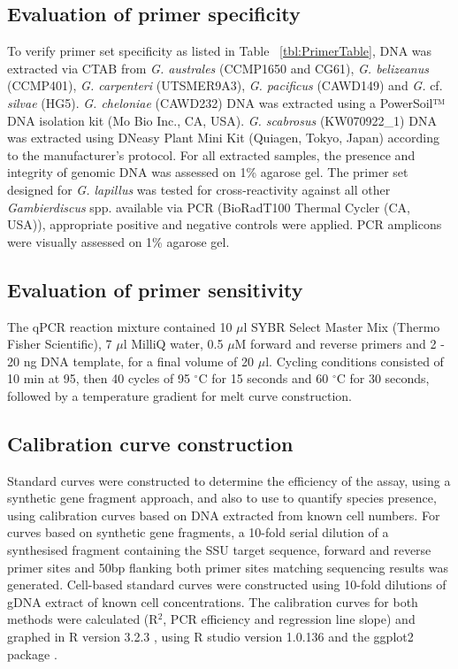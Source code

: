 \documentclass[12pt]{article}
\begin{document}
\subsection*{Evaluation of primer specificity}
To verify primer set specificity as listed in Table ~\ref{tbl:PrimerTable}, DNA was extracted via CTAB from \emph{G. australes} (CCMP1650 and CG61), \emph{G. belizeanus} (CCMP401), \emph{G. carpenteri} (UTSMER9A3), \emph{G. pacificus} (CAWD149) and \emph{G.} cf. \emph{silvae} (HG5). 
\emph{G. cheloniae} (CAWD232) DNA was extracted using a PowerSoil™ DNA isolation kit (Mo Bio Inc., CA, USA). 
\emph{G. scabrosus} (KW070922\_1) DNA was extracted using DNeasy Plant Mini Kit (Quiagen, Tokyo, Japan) according to the manufacturer's protocol. 
For all extracted samples, the presence and integrity of genomic DNA was assessed on 1\% agarose gel. 
The primer set designed for \emph{G. lapillus} %
was tested for cross-reactivity against all other \emph{Gambierdiscus} spp. available via PCR (BioRadT100 Thermal Cycler (CA, USA)), appropriate positive and negative controls were applied. 
PCR amplicons were visually assessed on 1\% agarose gel.


\subsection*{Evaluation of primer sensitivity}
The qPCR reaction mixture contained 10 $\mu$l SYBR Select Master Mix (Thermo Fisher Scientific), 7 $\mu$l MilliQ water, 0.5 $\mu$M forward and reverse primers and 2 - 20 ng DNA template, for a final volume of 20 $\mu$l. 
Cycling conditions consisted of 10 min at 95, then 40 cycles of 95 $^{\circ}$C for 15 seconds and 60 $^{\circ}$C for 30 seconds, followed by a temperature gradient for melt curve construction.
\subsection*{Calibration curve construction}
Standard curves were constructed to determine the efficiency of the assay, using a synthetic gene fragment approach, and also to use to quantify species presence, using calibration curves based on DNA extracted from known cell numbers. 
For curves based on synthetic gene fragments, a 10-fold serial dilution of a synthesised fragment containing the SSU target sequence, forward and reverse primer sites and 50bp flanking both primer sites matching sequencing results was generated. 
Cell-based standard curves were constructed using 10-fold dilutions of gDNA extract of known cell concentrations.
The calibration curves for both methods were calculated (R$^{2}$, PCR efficiency and regression line slope) and graphed in R version 3.2.3 \citep{rlang}, using R studio version 1.0.136 \citep{rstudio} and the ggplot2 package \citep{ggplot2}. 
\end{document}
